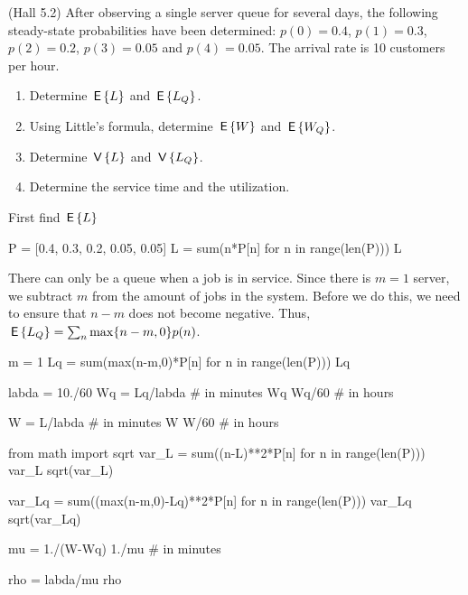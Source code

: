 \begin{exercise}(Hall 5.2) \label{exer: Hall} After observing a single server queue for
  several days, the following steady-state probabilities have been
  determined: $p(0)=0.4$, $p(1) = 0.3$, $p(2)=0.2$, $p(3)=0.05$ and
  $p(4)=0.05$. The arrival rate is 10 customers per hour. 
  \begin{enumerate}
  \item Determine $\,\mathsf{E}\left\{L\right\}$ and  $\,\mathsf{E}\left\{L_Q\right\}$. 
  \item Using Little's formula, determine $\,\mathsf{E}\left\{W\right\}$ and $\,\mathsf{E}\left\{W_Q\right\}$. 
\item Determine $\,\mathsf{V}\left\{L\right\}$ and $\,\mathsf{V}\left\{L_Q\right\}$.
  \item Determine the service time and the utilization.
  \end{enumerate}
    \begin{solution} First find $\,\mathsf{E}\left\{L\right\}$


\begin{pyconsole}
P = [0.4, 0.3, 0.2, 0.05, 0.05]
L = sum(n*P[n] for n in range(len(P)))
L
\end{pyconsole}

There can only be a queue when a job is in service. Since there is
$m=1$ server, we subtract $m$ from the amount of jobs in the system.
Before we do this, we need to ensure that $n-m$ does not become
negative. Thus, $\,\mathsf{E}\left\{L_Q\right\} = \sum_n \max\{n-m, 0\} p(n)$.

\begin{pyconsole}
m = 1
Lq = sum(max(n-m,0)*P[n] for n in range(len(P)))
Lq
\end{pyconsole}


\begin{pyconsole}
labda = 10./60
Wq = Lq/labda # in minutes
Wq
Wq/60 # in hours

W = L/labda # in minutes
W
W/60 # in hours
\end{pyconsole}


\begin{pyconsole}
from math import sqrt
var_L = sum((n-L)**2*P[n] for n in range(len(P)))
var_L
sqrt(var_L)
\end{pyconsole}


\begin{pyconsole}
var_Lq = sum((max(n-m,0)-Lq)**2*P[n] for n in range(len(P)))
var_Lq
sqrt(var_Lq)
\end{pyconsole}


\begin{pyconsole}
mu = 1./(W-Wq)
1./mu # in minutes

rho = labda/mu
rho
\end{pyconsole}


\end{solution}
\end{exercise}
